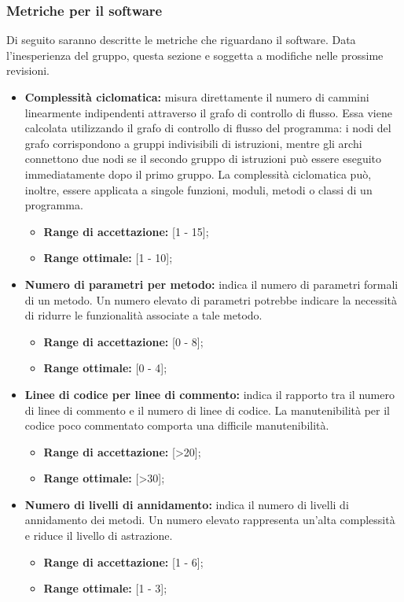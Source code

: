 	\subsubsection{Metriche per il software}
	Di seguito saranno descritte le metriche che riguardano il software. Data l'inesperienza del gruppo, questa sezione e soggetta a modifiche nelle prossime revisioni.
	\begin{itemize}
		\item \textbf{Complessità ciclomatica:} misura direttamente il numero di cammini linearmente indipendenti attraverso il grafo di controllo di flusso. Essa viene calcolata utilizzando il grafo di controllo di flusso del programma: i nodi del grafo corrispondono a gruppi indivisibili di istruzioni, mentre gli archi connettono due nodi se il secondo gruppo di istruzioni può essere eseguito immediatamente dopo il primo gruppo. La complessità ciclomatica può, inoltre, essere applicata a singole funzioni, moduli, metodi o classi di un programma.
			\begin{itemize}
				\item \textbf{Range di accettazione:} [1 - 15];
				\item \textbf{Range ottimale:} [1 - 10];
			\end{itemize}
		\item \textbf{Numero di parametri per metodo:} indica il numero di parametri formali di un metodo. Un numero elevato di parametri potrebbe indicare la necessità di ridurre le funzionalità associate a tale metodo.
			\begin{itemize}
				\item \textbf{Range di accettazione:} [0 - 8];
				\item \textbf{Range ottimale:} [0 - 4];
			\end{itemize}
		\item \textbf{Linee di codice per linee di commento:} indica il rapporto tra il numero di linee di commento e il numero di linee di codice. La manutenibilità per il codice poco commentato comporta una difficile manutenibilità.
			\begin{itemize}
				\item \textbf{Range di accettazione:} [>20];
				\item \textbf{Range ottimale:} [>30];
			\end{itemize}
		\item \textbf{Numero di livelli di annidamento:} indica il numero di livelli di annidamento dei metodi. Un numero elevato rappresenta un'alta complessità e riduce il livello di astrazione.
			\begin{itemize}
				\item \textbf{Range di accettazione:} [1 - 6];
				\item \textbf{Range ottimale:} [1 - 3];
			\end{itemize}
	\end{itemize}